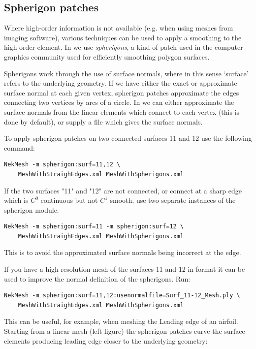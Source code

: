\subsection{Spherigon patches}

Where high-order information is not available (e.g. when using meshes from
imaging software), various techniques can be used to apply a smoothing to the
high-order element. In \nm we use \emph{spherigons}, a kind of patch used in the
computer graphics community used for efficiently smoothing polygon surfaces.

Spherigons work through the use of surface normals, where in this sense
`surface' refers to the underlying geometry. If we have either the exact or
approximate surface normal at each given vertex, spherigon patches approximate
the edges connecting two vertices by arcs of a circle. In \nm we can either
approximate the surface normals from the linear elements which connect to each
vertex (this is done by default), or supply a file which gives the surface
normals.

To apply spherigon patches on two connected surfaces 11 and 12 use the following
command:
%
\begin{lstlisting}[style=BashInputStyle]
NekMesh -m spherigon:surf=11,12 \
    MeshWithStraighEdges.xml MeshWithSpherigons.xml
\end{lstlisting}
%
If the two surfaces "11" and "12" are not connected, or connect at a sharp edge
which is $C^0$ continuous but not $C^1$ smooth, use two separate instances of
the spherigon module.
%
\begin{lstlisting}[style=BashInputStyle]
NekMesh -m spherigon:surf=11 -m spherigon:surf=12 \
    MeshWithStraighEdges.xml MeshWithSpherigons.xml
\end{lstlisting}
%
This is to avoid the approximated surface normals being incorrect at the edge.

If you have a high-resolution mesh of the surfaces 11 and 12 in \inltt{ply}
format it can be used to improve the normal definition of the spherigons. Run:
\begin{lstlisting}[style=BashInputStyle]
NekMesh -m spherigon:surf=11,12:usenormalfile=Surf_11-12_Mesh.ply \
    MeshWithStraighEdges.xml MeshWithSpherigons.xml
\end{lstlisting}

This can be useful, for example, when meshing the Leading edge of an
airfoil. Starting from a linear mesh (left figure) the spherigon patches curve
the surface elements producing leading edge closer to the underlying geometry:

